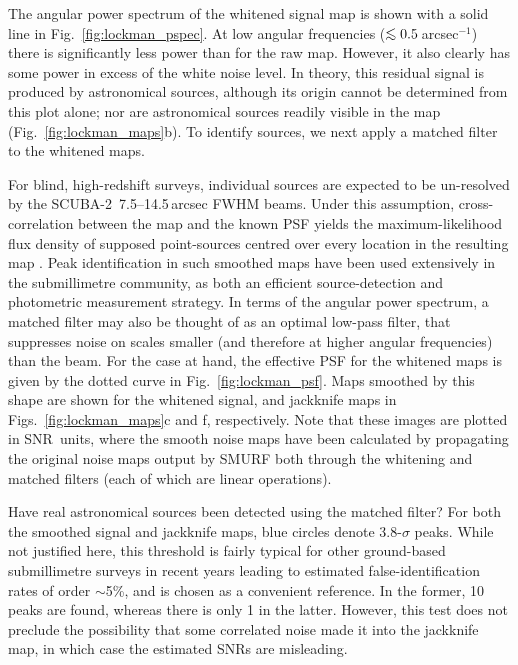 \documentclass[useAMS,usenatbib,nofootinbib]{mn2e}
\newcommand{\snr}{SNR}
\newcommand{\scuba}{SCUBA-2}
\def\lsim{\mathrel{\lower2.5pt\vbox{\lineskip=0pt\baselineskip=0pt
          \hbox{$<$}\hbox{$\sim$}}}}
\begin{document}
The angular power spectrum of the whitened signal map is shown with a
solid line in Fig.~\ref{fig:lockman_pspec}. At low angular frequencies
($\lsim 0.5$\,arcsec$^{-1}$) there is significantly less power than
for the raw map. However, it also clearly has some power in excess of
the white noise level. In theory, this residual signal is produced by
astronomical sources, although its origin cannot be determined from
this plot alone; nor are astronomical sources readily visible in the
map (Fig.~\ref{fig:lockman_maps}b). To identify sources, we next apply
a matched filter to the whitened maps.

For blind, high-redshift surveys, individual sources are expected to
be un-resolved by the \scuba\ 7.5--14.5\,arcsec FWHM beams. Under this
assumption, cross-correlation between the map and the known PSF yields
the maximum-likelihood flux density of supposed point-sources centred
over every location in the resulting map \citep[an extremely
well-known result throughout astronomy, see][]{stetson1987}. Peak
identification in such smoothed maps have been used extensively in the
submillimetre community, as both an efficient source-detection and
photometric measurement strategy. In terms of the angular power
spectrum, a matched filter may also be thought of as an optimal
low-pass filter, that suppresses noise on scales smaller (and
therefore at higher angular frequencies) than the beam. For the case
at hand, the effective PSF for the whitened maps is given by the
dotted curve in Fig.~\ref{fig:lockman_psf}. Maps smoothed by this
shape are shown for the whitened signal, and jackknife maps in
Figs.~\ref{fig:lockman_maps}c and f, respectively. Note that these
images are plotted in \snr\ units, where the smooth noise maps have
been calculated by propagating the original noise maps output by SMURF
both through the whitening and matched filters (each of which are
linear operations).

Have real astronomical sources been detected using the matched filter?
For both the smoothed signal and jackknife maps, blue circles denote
3.8-$\sigma$ peaks. While not justified here, this threshold is fairly
typical for other ground-based submillimetre surveys in recent years
\citep[e.g.,][]{coppin2006,perera2008,2009ApJ...707.1201W} leading to
estimated false-identification rates of order $\sim$5\%, and is chosen
as a convenient reference. In the former, 10 peaks are found, whereas
there is only 1 in the latter. However, this test does not preclude
the possibility that some correlated noise made it into the jackknife
map, in which case the estimated \snr s are misleading.
\end{document}
